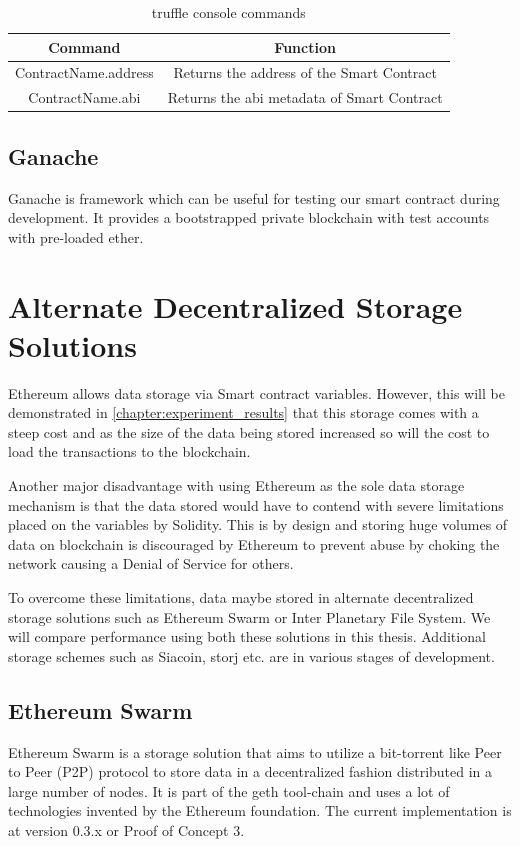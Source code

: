 \documentclass[11pt,openright]{report}
\begin{document}
\begin{table}[!htbp]
	\renewcommand{\arraystretch}{1.3}
	\caption{truffle console commands}
	\label{truffle_console}
	\centering
	\begin{tabular}{|c|c|}
		\hline
		\bfseries Command & \bfseries Function \\
		\hline\hline
		ContractName.address & Returns the address of the Smart Contract \\ \hline
		ContractName.abi & Returns the abi metadata of Smart Contract \\ \hline

	\end{tabular}
\end{table}

\subsection{Ganache}
Ganache is framework which can be useful for testing our smart contract during development. It provides a bootstrapped private blockchain with test accounts with pre-loaded ether.

\section{Alternate Decentralized Storage Solutions}
Ethereum allows data storage via Smart contract variables. However, this will be demonstrated in \ref{chapter:experiment_results} that this storage comes with a steep cost and as the size of the data being stored increased so will the cost to load the transactions to the blockchain.

Another major disadvantage with using Ethereum as the sole data storage mechanism is that the data stored would have to contend with severe limitations placed on the variables by Solidity. This is by design and storing huge volumes of data on blockchain is discouraged by Ethereum to prevent abuse by choking the network causing a Denial of Service for others.

To overcome these limitations, data maybe stored in alternate decentralized storage solutions such as Ethereum Swarm or Inter Planetary File System. We will compare performance using both these solutions in this thesis. Additional storage schemes such as Siacoin, storj etc. are in various stages of development.

\subsection{Ethereum Swarm}
Ethereum Swarm is a storage solution that aims to utilize a bit-torrent like Peer to Peer (P2P) protocol to store data  in a decentralized fashion distributed in a large number of nodes. It is part of the geth tool-chain and uses a lot of technologies invented by the Ethereum foundation. The current implementation is at version 0.3.x or Proof of Concept 3. 
\end{document}
